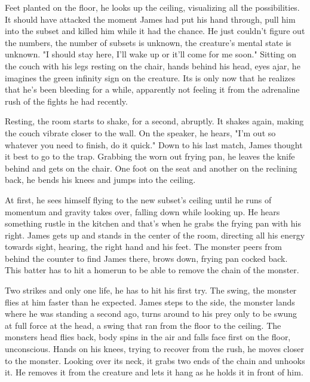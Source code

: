         Feet planted on the floor, he looks up the ceiling, visualizing all the possibilities. It should have attacked the moment James had put
    his hand through, pull him into the subset and killed him while it had the chance. He just couldn't figure out the numbers, the number
    of subsets is unknown, the creature's mental state is unknown. "I should stay here, I'll wake up or it'll come for me soon." Sitting on the
    couch with his legs resting on the chair, hands behind his head, eyes ajar, he imagines the green infinity sign on the creature. Its is only
    now that he realizes that he's been bleeding for a while, apparently not feeling it from the adrenaline rush of the fights he had recently.

        Resting, the room starts to shake, for a second, abruptly. It shakes again, making the couch vibrate closer to the wall. On the speaker,
    he hears, "I'm out so whatever you need to finish, do it quick." Down to his last match, James thought it best to go to the trap. Grabbing
    the worn out frying pan, he leaves the knife behind and gets on the chair. One foot on the seat and another on the reclining back, he
    bends his knees and jumps into the ceiling.

        At first, he sees himself flying to the new subset's ceiling until he runs of momentum and gravity takes over, falling down while
    looking up. He hears something rustle in the kitchen and that's when he grabs the frying pan with his right. James gets up and stands in
    the center of the room, directing all his energy towards sight, hearing, the right hand and his feet. The monster peers from behind the 
    counter to find James there, brows down, frying pan cocked back. This batter has to hit a homerun to be able to remove the chain of the
    monster.

        Two strikes and only one life, he has to hit his first try. The swing, the monster flies at him faster than he expected. James steps to
    the side, the monster lands where he was standing a second ago, turns around to his prey only to be swung at full force at the head, a
    swing that ran from the floor to the ceiling. The monsters head flies back, body spins in the air and falls face first on the floor,
    unconscious. Hands on his knees, trying to recover from the rush, he moves closer to the monster. Looking over its neck, it grabs two
    ends of the chain and unhooks it. He removes it from the creature and lets it hang as he holds it in front of him.

